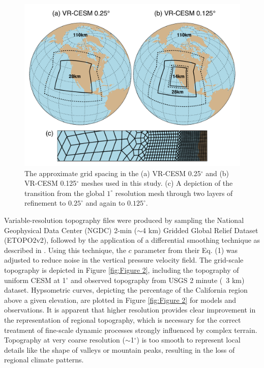 \begin{figure}
\begin{center}
\includegraphics[width=6in]{worldmap_modified.pdf}
\caption{The approximate grid spacing in the (a) VR-CESM 0.25$^\circ$ and (b) VR-CESM 0.125$^\circ$ meshes used in this study. (c) A depiction of the transition from the global $1^\circ$ resolution mesh through two layers of refinement to $0.25^\circ$ and again to $0.125^\circ$.}
\label{fig:Figure 1}
\end{center}
\end{figure}


Variable-resolution topography files were produced by sampling the National Geophysical Data Center (NGDC) 2-min ($\sim$4 km) Gridded Global Relief Dataset (ETOPO2v2), followed by the application of a differential smoothing technique as described in \cite{zarzycki2015effects}.  Using this technique, the $c$ parameter from their Eq. (1) was adjusted to reduce noise in the vertical pressure velocity field. The grid-scale topography is depicted in Figure \ref{fig:Figure 2}, including the topography of uniform CESM at 1$^\circ$ and observed topography from USGS 2 minute (~3 km) dataset. Hypsometric curves, depicting the percentage of the California region above a given elevation, are plotted in Figure \ref{fig:Figure 2} for models and observations. It is apparent that higher resolution provides clear improvement in the representation of regional topography, which is necessary for the correct treatment of fine-scale dynamic processes strongly influenced by complex terrain. Topography at very coarse resolution ($\sim$1$^\circ$) is too smooth to represent local details like the shape of valleys or mountain peaks, resulting in the loss of regional climate patterns.

